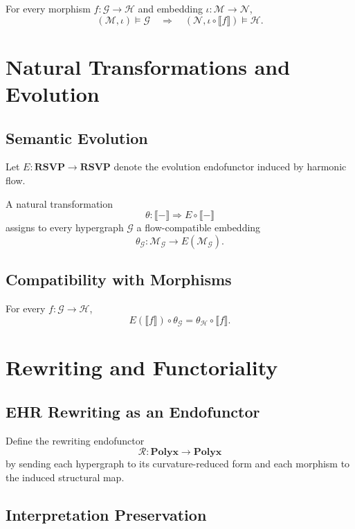 For every morphism $f:\mathcal{G}\to\mathcal{H}$ and embedding $\iota:\mathcal{M}\to\mathcal{N}$,
\[
(\mathcal{M},\iota) \models \mathcal{G}
\quad\Longrightarrow\quad
(\mathcal{N},\iota\circ \llbracket f \rrbracket) \models \mathcal{H}.
\]

\section{Natural Transformations and Evolution}

\subsection{Semantic Evolution}

Let $E:\mathbf{RSVP}\to\mathbf{RSVP}$ denote the evolution endofunctor induced by harmonic flow.

A natural transformation
\[
\theta : \llbracket - \rrbracket \Longrightarrow E\circ \llbracket - \rrbracket
\]
assigns to every hypergraph $\mathcal{G}$ a flow-compatible embedding
\[
\theta_{\mathcal{G}} : \mathcal{M}_{\mathcal{G}} \to E(\mathcal{M}_{\mathcal{G}}).
\]

\subsection{Compatibility with Morphisms}

For every $f:\mathcal{G}\to\mathcal{H}$,
\[
E(\llbracket f \rrbracket)\circ \theta_{\mathcal{G}}
=
\theta_{\mathcal{H}} \circ \llbracket f \rrbracket.
\]

\section{Rewriting and Functoriality}

\subsection{EHR Rewriting as an Endofunctor}

Define the rewriting endofunctor
\[
\mathcal{R} : \mathbf{Polyx} \to \mathbf{Polyx}
\]
by sending each hypergraph to its curvature-reduced form and each morphism to the induced structural map.

\subsection{Interpretation Preservation}

